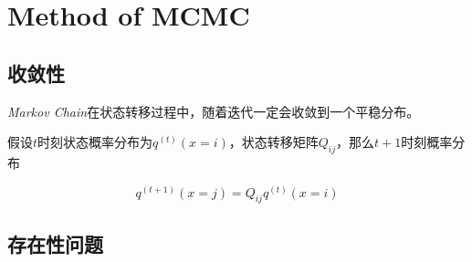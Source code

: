 \chapter{Method of MCMC}

\section{收敛性}

\textsl{Markov Chain}在状态转移过程中，随着迭代一定会收敛到一个平稳分布。

假设$t$时刻状态概率分布为$q^{(t)}(x=i)$，状态转移矩阵$Q_{ij}$，那么$t+1$时刻概率分布

\begin{equation}
    q^{(t+1)}(x=j)=Q_{ij}q^{(t)}(x=i)
\end{equation}

\section{存在性问题}